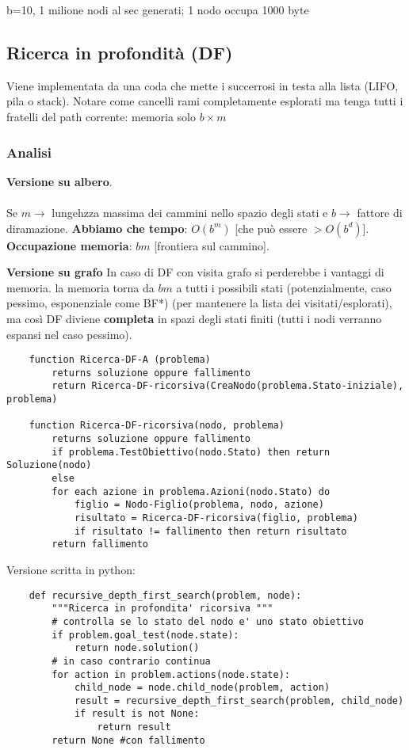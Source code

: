 \begin{example}
	b=10, 1 milione nodi al sec generati; 1 nodo occupa 1000 byte
\end{example}

\subsection{Ricerca in profondità (DF)}
Viene implementata da una coda che mette i succerrosi in testa alla lista (LIFO, pila o stack). Notare
come cancelli rami completamente esplorati ma tenga tutti i fratelli del path corrente: memoria solo $b \times m$

\subsubsection*{Analisi}
\textbf{Versione su albero}.\\\\
Se $m \to$ lungehzza massima dei cammini nello spazio degli stati e $b \to$ fattore di diramazione.
\textbf{Abbiamo che tempo}: $O(b^m)$ [che può essere $> O(b^d)$].
\textbf{Occupazione memoria}: $bm$ [frontiera sul cammino].

\textbf{Versione su grafo}
In caso di DF con visita grafo si perderebbe i vantaggi di memoria. la memoria torna da
$bm$ a tutti i possibili stati (potenzialmente, caso pessimo, esponenziale come BF*) (per mantenere la lista
dei visitati/esplorati), ma così DF diviene \textbf{completa} in spazi degli stati finiti (tutti 
i nodi verranno espansi nel caso pessimo).

\begin{lstlisting}
	function Ricerca-DF-A (problema)
		returns soluzione oppure fallimento
		return Ricerca-DF-ricorsiva(CreaNodo(problema.Stato-iniziale), problema)
		
	function Ricerca-DF-ricorsiva(nodo, problema)
		returns soluzione oppure fallimento
		if problema.TestObiettivo(nodo.Stato) then return Soluzione(nodo)
		else
		for each azione in problema.Azioni(nodo.Stato) do
			figlio = Nodo-Figlio(problema, nodo, azione)
			risultato = Ricerca-DF-ricorsiva(figlio, problema)
			if risultato != fallimento then return risultato
		return fallimento
\end{lstlisting}
Versione scritta in python:
\begin{lstlisting}
	def recursive_depth_first_search(problem, node):
		"""Ricerca in profondita' ricorsiva """
		# controlla se lo stato del nodo e' uno stato obiettivo
		if problem.goal_test(node.state):
			return node.solution()
		# in caso contrario continua
		for action in problem.actions(node.state):
			child_node = node.child_node(problem, action)
			result = recursive_depth_first_search(problem, child_node)
			if result is not None:
				return result
		return None #con fallimento
\end{lstlisting}

